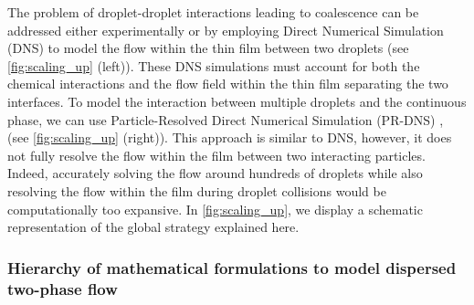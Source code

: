 The problem of droplet-droplet interactions leading to coalescence can be addressed either experimentally or by employing Direct Numerical Simulation (DNS) to model the flow within the thin film between two droplets (see \ref{fig:scaling_up} (left)).
These DNS simulations must account for both the chemical interactions and the flow field within the thin film separating the two interfaces.
To model the interaction between multiple droplets and the continuous phase, we can use Particle-Resolved Direct Numerical Simulation (PR-DNS) \citep{tryggvason2006direct}, (see \ref{fig:scaling_up} (right)).
This approach is similar to DNS, however, it does not fully resolve the flow within the film between two interacting particles.
Indeed, accurately solving the flow around hundreds of droplets while also resolving the flow within the film during droplet collisions would be computationally too expansive.
In \ref{fig:scaling_up}, we display a schematic representation of the global strategy explained here.




\subsubsection{Hierarchy of mathematical formulations to model dispersed two-phase flow}

